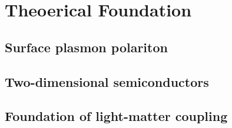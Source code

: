 
\chapter{Theoerical Foundation}
\label{sec:Theo}

\section{Surface plasmon polariton}


\section{Two-dimensional semiconductors}


\section{Foundation of light-matter coupling}
